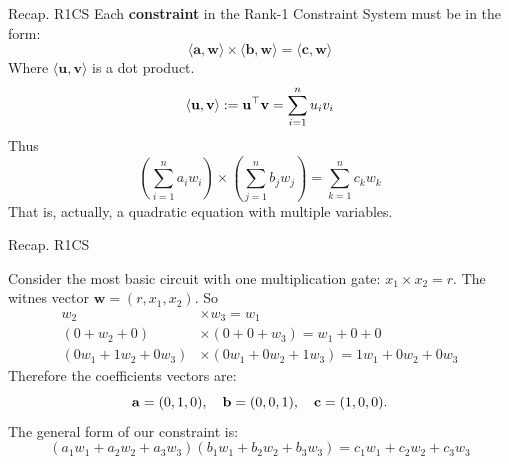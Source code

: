 \documentclass{zkdl-presentation-template}
\begin{document}
    \begin{frame}{Recap. R1CS}
        Each \textbf{constraint} in the Rank-1 Constraint System must be in the form:
        \begin{equation*}
            \langle \mathbf{a}, \mathbf{w}\rangle \times \langle \mathbf{b}, \mathbf{w}\rangle = \langle \mathbf{c}, \mathbf{w}\rangle
        \end{equation*}
        \pause
        Where $\langle \mathbf{u}, \mathbf{v}\rangle$ is a dot product.
        \vspace{-10pt}
        \begin{equation*}
            \langle \mathbf{u}, \mathbf{v} \rangle := \mathbf{u}^{\top}\mathbf{v} = \sum_{i=1}^{n} u_i v_i 
            \vspace{-5pt}
        \end{equation*}
        \pause
        Thus
        \vspace{-5pt}
        \begin{equation*}
            \left(\sum_{i=1}^{n} a_i w_i\right) \times \left(\sum_{j=1}^{n} b_j w_j\right) = \sum_{k=1}^{n} c_k w_k
        \end{equation*}
        That is, actually, a quadratic equation with multiple variables.
    \end{frame}

    \begin{frame}{Recap. R1CS}
        \begin{example}
            Consider the most basic circuit with one multiplication gate: $x_1 \times x_2 = r$.
            The witnes vector $\mathbf{w} = (r, x_1, x_2)$. So
            \vspace{-5pt}
            \begin{align*}
                w_2 &\times w_3 = w_1 \\
                (0 + w_2 + 0) &\times (0 + 0 + w_3) = w_1 + 0 + 0 \\
                (0w_1 + 1w_2 + 0w_3) &\times (0w_1 + 0w_2 + 1w_3) = 1w_1 + 0w_2 + 0w_3
            \end{align*}
            Therefore the coefficients vectors are:
            \vspace{-5pt}
            \begin{equation*}
                \mathbf{a} = (0, 1, 0), \quad \mathbf{b} = (0, 0, 1), \quad \mathbf{c} = (1, 0, 0). 
                \vspace{-5pt}
            \end{equation*}
            The general form of our constraint is:
            \vspace{-5pt}
            \begin{equation*}
                (a_1w_1 + a_2w_2 + a_3w_3)(b_1w_1 + b_2w_2 + b_3w_3) = c_1w_1 + c_2w_2 + c_3w_3
            \end{equation*}
        \end{example}
    \end{frame}
\end{document}
